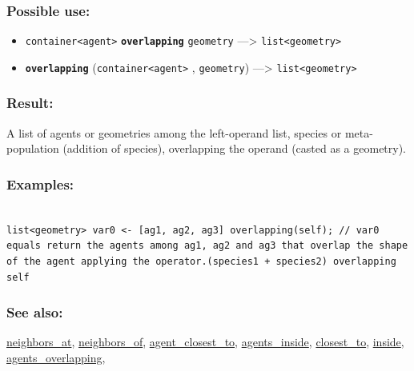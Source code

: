 \documentclass[]{book}
\providecommand{\tightlist}{%
  \setlength{\itemsep}{0pt}\setlength{\parskip}{0pt}}
\theoremstyle{definition}
\theoremstyle{definition}
\theoremstyle{definition}
\theoremstyle{remark}
\begin{document}
\subsubsection{Possible use:}\label{possible-use-390}

\begin{itemize}
\tightlist
\item
  \texttt{container\textless{}agent\textgreater{}}
  \textbf{\texttt{overlapping}} \texttt{geometry} ---\textgreater{}
  \texttt{list\textless{}geometry\textgreater{}}
\item
  \textbf{\texttt{overlapping}}
  (\texttt{container\textless{}agent\textgreater{}} , \texttt{geometry})
  ---\textgreater{} \texttt{list\textless{}geometry\textgreater{}}
\end{itemize}

\subsubsection{Result:}\label{result-376}

A list of agents or geometries among the left-operand list, species or
meta-population (addition of species), overlapping the operand (casted
as a geometry).

\subsubsection{Examples:}\label{examples-268}

\begin{verbatim}
 
list<geometry> var0 <- [ag1, ag2, ag3] overlapping(self); // var0 equals return the agents among ag1, ag2 and ag3 that overlap the shape of the agent applying the operator.(species1 + species2) overlapping self 
\end{verbatim}

\subsubsection{See also:}\label{see-also-156}

\href{operators-n-to-r.html\#neighbors_at}{neighbors\_at},
\href{operators-n-to-r.html\#neighbors_of}{neighbors\_of},
\href{operators-a-to-a.html\#agent_closest_to}{agent\_closest\_to},
\href{operators-a-to-a.html\#agents_inside}{agents\_inside},
\href{operators-b-to-c.html\#closest_to}{closest\_to},
\href{operators-i-to-m.html\#inside}{inside},
\href{operators-a-to-a.html\#agents_overlapping}{agents\_overlapping},
\end{document}
